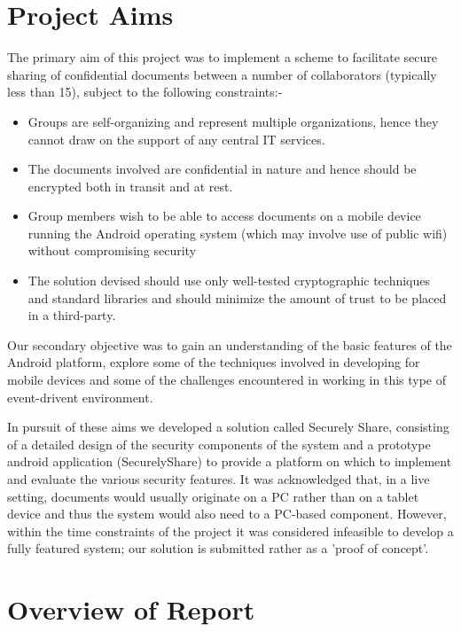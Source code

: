 \section{Project Aims}
\label{sec:aims}
The primary aim of this project was to implement a scheme to facilitate secure sharing of confidential documents between a number of collaborators (typically less than 15), subject to the following constraints:-
\begin{itemize}
\item Groups are self-organizing and represent multiple organizations, hence they cannot draw on the support of any central IT services.
\item The documents involved are confidential in nature and hence should be encrypted both in transit and at rest.
\item Group members wish to be able to access documents on a mobile device running the Android operating system (which may involve use of public wifi) without compromising security 
\item The solution devised should use only well-tested cryptographic techniques and standard libraries and should minimize the amount of trust to be placed in a third-party.
\end{itemize}

Our secondary objective was to gain an understanding of the basic features of the Android platform, explore some of the techniques involved in developing  for mobile devices and some of the challenges encountered in working in this type of event-drivent environment.

In pursuit of these aims we developed a solution called Securely Share, consisting of a detailed design of the security components of the system and a prototype android application (SecurelyShare) to provide a platform on which to implement and evaluate the various security features.  It was acknowledged that, in a live setting, documents would usually originate on a PC rather than on a tablet device and thus the system would also need to a PC-based component.  However, within the time constraints of the project it was considered infeasible to develop a fully featured system; our solution is submitted rather as a 'proof of concept'.

\section{Overview of Report}
\label{sec:overview}

